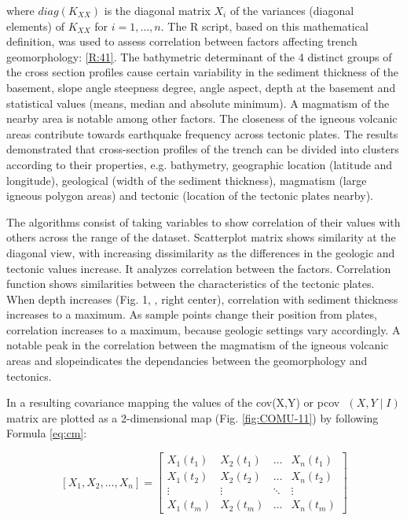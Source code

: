 \documentclass[11pt,a4paper]{report}
\newcommand{\myequations}[1]{%
\addcontentsline{equ}{myequations}{\protect\numberline{\theequation}#1}\par}
\begin{document}
{where $diag(K_{XX})$ is the diagonal matrix $X_{i}$ of the variances (diagonal elements) of $K_{XX}$ for $i=1,\dots,n$. The R script, based on this mathematical definition, was used to assess correlation between factors affecting trench geomorphology: \ref{R:41}. The bathymetric determinant of the 4 distinct groups of the cross section profiles cause certain variability in the sediment thickness of the basement, slope angle steepness degree, angle aspect, depth at the basement and statistical values (means, median and absolute minimum). A magmatism of the nearby area is notable among other factors. The closeness of the igneous volcanic areas contribute towards earthquake frequency across tectonic plates. The results demonstrated that cross-section profiles of the trench can be divided into clusters according to their properties, e.g. bathymetry, geographic location (latitude and longitude), geological (width of the sediment thickness), magmatism (large igneous polygon areas) and tectonic (location of the tectonic plates nearby).

The algorithms consist of taking variables to show correlation of their values with others across the range of the dataset. Scatterplot matrix shows similarity at the diagonal view, with increasing dissimilarity as the differences in the geologic and tectonic values increase. It analyzes correlation between the factors. Correlation function shows similarities between the characteristics of the tectonic plates. When depth increases (Fig. 1, \cite{Lemenkova201901}, right center), correlation with sediment thickness increases to a maximum. As sample points change their position from plates, correlation increases to a maximum, because geologic settings vary accordingly. A notable peak in the correlation between the magmatism of the igneous volcanic areas and slope\degree indicates the dependancies between the geomorphology and tectonics. 

In a resulting covariance mapping the values of the cov(X,Y) or pcov ⁡ $(X, Y \mid I)$ matrix are plotted as a 2-dimensional map (Fig. \ref{fig:COMU-11}) by following Formula \ref{eq:cm}:

\begin{equation}
	\left[X_{1}, X_{2},\dots, X_{n}\right]=
	\begin{bmatrix}
		X_{1}(t_{1}) & X_{2}(t_{1}) & \dots & X_{n}(t_{1}) \\
		X_{1}(t_{2}) & X_{2}(t_{2}) & \dots & X_{n}(t_{2}) \\
		\vdots & \vdots & \ddots & \vdots \\
		X_{1}(t_{m}) & X_{2}(t_{m}) & \dots & X_{n}(t_{m})
	\end{bmatrix}
\end{equation}\label{eq:cm}\myequations{Covariance 2D matrix mapping}

}
\end{document}
